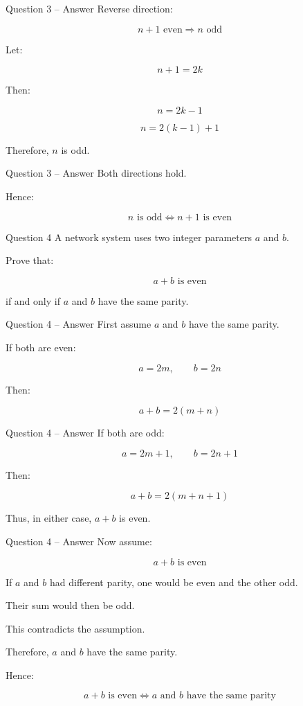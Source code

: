 \begin{frame}{Question 3 -- Answer}
Reverse direction:

$$
n+1\text{ even}\Rightarrow n\text{ odd}
$$

Let:

$$
n+1=2k
$$

Then:

$$
n=2k-1
$$

$$
n=2(k-1)+1
$$

Therefore, $n$ is odd.
\end{frame}

\begin{frame}{Question 3 -- Answer}
Both directions hold.

Hence:

$$
\boxed{n\text{ is odd}\iff n+1\text{ is even}}
$$

\end{frame}


\begin{frame}{Question 4}
A network system uses two integer parameters $a$ and $b$.

Prove that:

$$
a+b\text{ is even}
$$

if and only if $a$ and $b$ have the same parity.
\end{frame}

\begin{frame}{Question 4 -- Answer}
First assume $a$ and $b$ have the same parity.

If both are even:

$$
a=2m,\qquad b=2n
$$

Then:

$$
a+b=2(m+n)
$$

\end{frame}

\begin{frame}{Question 4 -- Answer}
If both are odd:

$$
a=2m+1,\qquad b=2n+1
$$

Then:

$$
a+b=2(m+n+1)
$$

Thus, in either case, $a+b$ is even.
\end{frame}

\begin{frame}{Question 4 -- Answer}
Now assume:

$$
a+b\text{ is even}
$$

If $a$ and $b$ had different parity, one would be even and the other odd.

Their sum would then be odd.

This contradicts the assumption.

Therefore, $a$ and $b$ have the same parity.

Hence:

$$
\boxed{a+b\text{ is even}\iff
a\text{ and }b\text{ have the same parity}}
$$

\end{frame}

